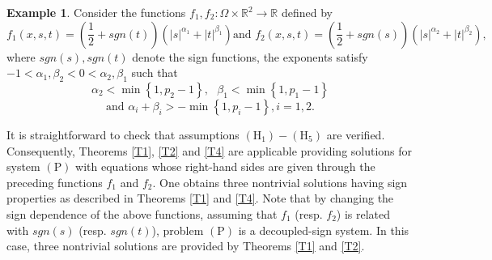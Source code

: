 \documentclass[11pt]{amsart}
\theoremstyle{definition}
\newtheorem{example}[theorem]{Example}
\theoremstyle{remark}
\numberwithin{equation}{section}
\begin{document}
\begin{example}
Consider the functions $f_{1},f_{2}:\Omega \times 
\mathbb{R}
^{2}\rightarrow 
\mathbb{R}
$ defined by 
\begin{equation*}
f_{1}(x,s,t)=(\frac{1}{2}+sgn(t))(|s|^{\alpha _{1}}+|t|^{\beta _{1}})\text{
\ and \ }f_{2}(x,s,t)=(\frac{1}{2}+sgn(s))(|s|^{\alpha _{2}}+|t|^{\beta
_{2}}),
\end{equation*}%
where $sgn(s),sgn(t)$ denote the sign functions, the exponents satisfy $%
-1<\alpha _{1},\beta _{2}<0<\alpha _{2},\beta _{1}$ such that 
\begin{equation*}
\alpha _{2}<\min \left\{ 1,p_{2}-1\right\} ,\text{ \ }\beta _{1}<\min
\left\{ 1,p_{1}-1\right\} 
\end{equation*}%
\begin{equation*}
\text{and \ \ }\alpha _{i}+\beta _{i}>-\min \left\{ 1,p_{i}-1\right\} ,\text{
}i=1,2.
\end{equation*}

It is straightforward to check that assumptions $(\mathrm{H}_{1})-(\mathrm{H}%
_{5})$ are verified. Consequently, Theorems \ref{T1}, \ref{T2} and \ref{T4}
are applicable providing solutions for system $(\mathrm{P})$ with equations
whose right-hand sides are given through the preceding functions $f_{1}$ and 
$f_{2}$. One obtains three nontrivial solutions having sign properties as
described in Theorems \ref{T1} and \ref{T4}. Note that by changing the sign
dependence of the above functions, assuming that $f_{1}$ (resp. $f_{2}$) is
related with $sgn(s)$ (resp. $sgn(t)$), problem $(\mathrm{P})$ is a
decoupled-sign system. In this case, three nontrivial solutions are provided
by Theorems \ref{T1} and \ref{T2}.
\end{example}
\end{document}
